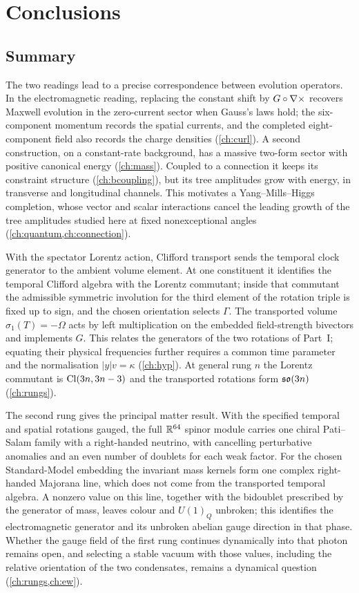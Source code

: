 \chapter{Conclusions}
\label{ch:conclusions}

\section{Summary}

The two readings lead to a precise correspondence between evolution operators. In the electromagnetic reading, replacing the constant
shift by $G\circ\nabla\times$ recovers Maxwell evolution in the zero-current sector when Gauss's laws hold; the six-component momentum records the
spatial currents, and the completed eight-component field also records the charge densities (\cref{ch:curl}). A second construction, on a
constant-rate background, has a massive two-form sector with positive canonical energy (\cref{ch:mass}). Coupled to a connection it keeps
its constraint structure (\cref{ch:bcoupling}), but its tree amplitudes grow with energy, in transverse and longitudinal channels. This
motivates a Yang--Mills--Higgs completion, whose vector and scalar interactions cancel the leading growth of the tree amplitudes studied here
at fixed nonexceptional angles (\cref{ch:quantum,ch:connection}).

With the spectator Lorentz action, Clifford transport sends the temporal clock generator to the ambient volume element. At one constituent it
identifies the temporal Clifford algebra with the Lorentz commutant; inside that commutant the admissible symmetric involution for the third
element of the rotation triple is fixed up to sign, and the chosen orientation selects $\Gamma$. The transported volume $\sigma_1(T)=-\Omega$ acts by left multiplication on the embedded field-strength bivectors and
implements $G$. This relates the generators of the two rotations of Part~I; equating their physical frequencies further requires a common
time parameter and the normalisation $|y|v=\kappa$ (\cref{ch:hyp}). At general rung $n$ the Lorentz commutant is $\mathrm{Cl}(3n,3n-3)$ and the
transported rotations form $\mathfrak{so}(3n)$ (\cref{ch:rungs}).

The second rung gives the principal matter result. With the specified temporal and spatial rotations gauged, the full $\mathbb{R}^{64}$ spinor module
carries one chiral Pati--Salam family with a right-handed neutrino, with cancelling perturbative anomalies and an even number of doublets for
each weak factor. For the chosen Standard-Model embedding the invariant mass kernels form one complex right-handed Majorana line, which does
not come from the transported temporal algebra. A nonzero value on this line, together with the bidoublet prescribed by the generator of
mass, leaves colour and $U(1)_Q$ unbroken; this identifies the electromagnetic generator and its unbroken abelian gauge direction in that phase.
Whether the gauge field of the first rung continues dynamically into that photon remains open, and selecting a stable vacuum with those
values, including the relative orientation of the two condensates, remains a dynamical question (\cref{ch:rungs,ch:ew}).

